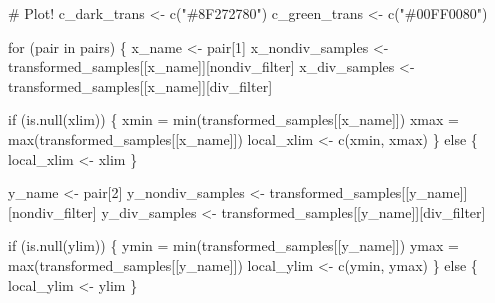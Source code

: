 \documentclass[
  letterpaper,
  DIV=11,
  numbers=noendperiod]{scrartcl}
\newenvironment{Shaded}{\begin{snugshade}}{\end{snugshade}}
\newcommand{\BuiltInTok}[1]{\textcolor[rgb]{0.00,0.23,0.31}{#1}}
\newcommand{\CommentTok}[1]{\textcolor[rgb]{0.37,0.37,0.37}{#1}}
\newcommand{\ControlFlowTok}[1]{\textcolor[rgb]{0.00,0.23,0.31}{#1}}
\newcommand{\DecValTok}[1]{\textcolor[rgb]{0.68,0.00,0.00}{#1}}
\newcommand{\KeywordTok}[1]{\textcolor[rgb]{0.00,0.23,0.31}{#1}}
\newcommand{\NormalTok}[1]{\textcolor[rgb]{0.00,0.23,0.31}{#1}}
\newcommand{\OperatorTok}[1]{\textcolor[rgb]{0.37,0.37,0.37}{#1}}
\newcommand{\StringTok}[1]{\textcolor[rgb]{0.13,0.47,0.30}{#1}}
\begin{document}
\begin{Shaded}
\begin{Highlighting}[]
  \CommentTok{\# Plot!}
\NormalTok{  c\_dark\_trans }\OperatorTok{\textless{}{-}}\NormalTok{ c(}\StringTok{"\#8F272780"}\NormalTok{)}
\NormalTok{  c\_green\_trans }\OperatorTok{\textless{}{-}}\NormalTok{ c(}\StringTok{"\#00FF0080"}\NormalTok{)}
  
  \ControlFlowTok{for}\NormalTok{ (pair }\KeywordTok{in}\NormalTok{ pairs) \{}
\NormalTok{    x\_name }\OperatorTok{\textless{}{-}}\NormalTok{ pair[}\DecValTok{1}\NormalTok{]}
\NormalTok{    x\_nondiv\_samples }\OperatorTok{\textless{}{-}}\NormalTok{ transformed\_samples[[x\_name]][nondiv\_filter]}
\NormalTok{    x\_div\_samples    }\OperatorTok{\textless{}{-}}\NormalTok{ transformed\_samples[[x\_name]][div\_filter]}
    
    \ControlFlowTok{if}\NormalTok{ (}\KeywordTok{is}\NormalTok{.null(xlim)) \{}
\NormalTok{      xmin }\OperatorTok{=} \BuiltInTok{min}\NormalTok{(transformed\_samples[[x\_name]])}
\NormalTok{      xmax }\OperatorTok{=} \BuiltInTok{max}\NormalTok{(transformed\_samples[[x\_name]])}
\NormalTok{      local\_xlim }\OperatorTok{\textless{}{-}}\NormalTok{ c(xmin, xmax)}
\NormalTok{    \} }\ControlFlowTok{else}\NormalTok{ \{}
\NormalTok{      local\_xlim }\OperatorTok{\textless{}{-}}\NormalTok{ xlim}
\NormalTok{    \}}
    
\NormalTok{    y\_name }\OperatorTok{\textless{}{-}}\NormalTok{ pair[}\DecValTok{2}\NormalTok{]}
\NormalTok{    y\_nondiv\_samples }\OperatorTok{\textless{}{-}}\NormalTok{ transformed\_samples[[y\_name]][nondiv\_filter]}
\NormalTok{    y\_div\_samples    }\OperatorTok{\textless{}{-}}\NormalTok{ transformed\_samples[[y\_name]][div\_filter]}
    
    \ControlFlowTok{if}\NormalTok{ (}\KeywordTok{is}\NormalTok{.null(ylim)) \{}
\NormalTok{      ymin }\OperatorTok{=} \BuiltInTok{min}\NormalTok{(transformed\_samples[[y\_name]])}
\NormalTok{      ymax }\OperatorTok{=} \BuiltInTok{max}\NormalTok{(transformed\_samples[[y\_name]])}
\NormalTok{      local\_ylim }\OperatorTok{\textless{}{-}}\NormalTok{ c(ymin, ymax)}
\NormalTok{    \} }\ControlFlowTok{else}\NormalTok{ \{}
\NormalTok{      local\_ylim }\OperatorTok{\textless{}{-}}\NormalTok{ ylim}
\NormalTok{    \}}
 

\end{Highlighting}
\end{Shaded}
\end{document}
